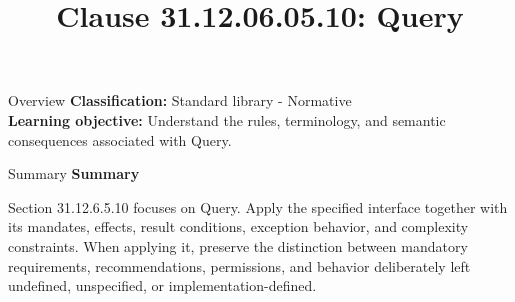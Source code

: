 \documentclass[10pt,letterpaper]{article}
\title{Clause 31.12.06.05.10: Query}
\author{}
\date{}
\begin{document}
\maketitle
\begin{CornellOverviewBox}{Overview}
\textbf{Classification:} Standard library - Normative\\[2pt]
\textbf{Learning objective:} Understand the rules, terminology, and semantic consequences associated with Query.
\end{CornellOverviewBox}\begin{CornellSummaryBox}{Summary}
{\sffamily\bfseries\color{Accent} Summary}\par\vspace{3pt}Section 31.12.6.5.10 focuses on Query. Apply the specified interface together with its mandates, effects, result conditions, exception behavior, and complexity constraints. When applying it, preserve the distinction between mandatory requirements, recommendations, permissions, and behavior deliberately left undefined, unspecified, or implementation-defined.
\end{CornellSummaryBox}
\end{document}
